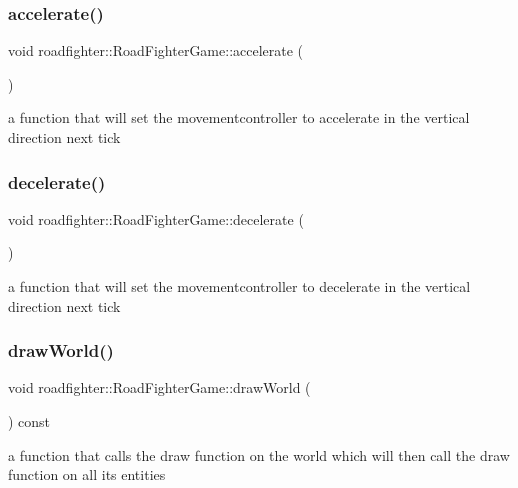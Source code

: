 \subsubsection{\texorpdfstring{accelerate()}{accelerate()}}
{\footnotesize\ttfamily void roadfighter\+::\+Road\+Fighter\+Game\+::accelerate (\begin{DoxyParamCaption}{ }\end{DoxyParamCaption})}

a function that will set the movementcontroller to accelerate in the vertical direction next tick \mbox{\label{classroadfighter_1_1RoadFighterGame_aa0d5fb2446d3d1c9ec320dcc79924fa7}} 
\subsubsection{\texorpdfstring{decelerate()}{decelerate()}}
{\footnotesize\ttfamily void roadfighter\+::\+Road\+Fighter\+Game\+::decelerate (\begin{DoxyParamCaption}{ }\end{DoxyParamCaption})}

a function that will set the movementcontroller to decelerate in the vertical direction next tick \mbox{\label{classroadfighter_1_1RoadFighterGame_a404d5a9afcad9e907ffd7edb589ae6cd}} 
\subsubsection{\texorpdfstring{draw\+World()}{drawWorld()}}
{\footnotesize\ttfamily void roadfighter\+::\+Road\+Fighter\+Game\+::draw\+World (\begin{DoxyParamCaption}{ }\end{DoxyParamCaption}) const}

a function that calls the draw function on the world which will then call the draw function on all its entities \mbox{\label{classroadfighter_1_1RoadFighterGame_a0915aa65c2ba6aeab74207d17cab1cd4}} 

